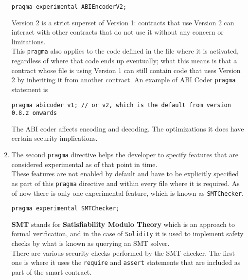 \begin{enumerate}
  \begin{lstlisting}[language=Solidity,numbers=none]
  pragma experimental ABIEncoderV2;
  \end{lstlisting}

  \hfill\break
  Version 2 is a strict superset of Version 1: contracts that use
  Version 2 can interact with other contracts that do not use it without
  any concern or limitations.\\

  This \texttt{pragma} also applies to the code defined in the file
  where it is activated, regardless of where that code ends up
  eventually; what this means is that a contract whose file is using
  Version 1 can still contain code that uses Version 2 by inheriting it
  from another contract. An example of ABI Coder \texttt{pragma}
  statement is\\

  \begin{lstlisting}[language=Solidity,numbers=none]
  pragma abicoder v1; // or v2, which is the default from version 0.8.z onwards
  \end{lstlisting}

  \hfill\break
  The ABI coder affects encoding and decoding. The optimizations it does
  have certain security implications.
\item
  The second \texttt{pragma} directive helps the developer to specify
  features that are considered experimental as of that point in time.\\

  These features are not enabled by default and have to be explicitly
  specified as part of this \texttt{pragma} directive and within every
  file where it is required. As of now there is only one experimental
  feature, which is known as \texttt{SMTChecker}.\\

  \begin{lstlisting}[language=Solidity,numbers=none]
  pragma experimental SMTChecker;
  \end{lstlisting}

  \hfill\break
  \textbf{SMT} stands for \textbf{Satisfiability Modulo Theory} which is
  an approach to formal verification, and in the case of
  \texttt{Solidity} it is used to implement safety checks by what is
  known as querying an SMT solver.\\

  There are various security checks performed by the SMT checker. The
  first one is where it uses the \texttt{require} and \texttt{assert}
  statements that are included as part of the smart contract.\\


\end{enumerate}
